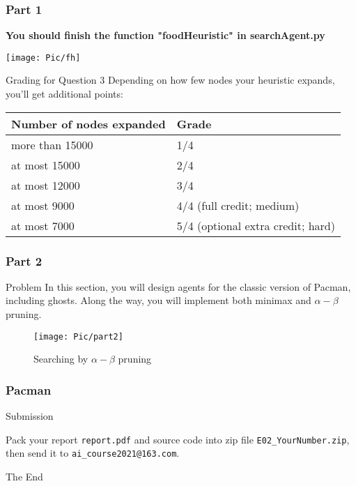 \documentclass{beamer}
\begin{document}
\begin{frame}
  \frametitle{Part 1}

      \textbf{You should finish the function "foodHeuristic" in searchAgent.py}

      \texttt{[image: Pic/fh]}

  \begin{block}{Grading for Question 3}
 Depending on how few nodes your heuristic expands, you'll get additional points:

\begin{center}
\begin{tabular}{||l||l||}
  \hline\hline
  Number of nodes expanded & Grade\\
  \hline\hline
  more than 15000 & 1/4\\
  \hline\hline
  at most 15000 & 2/4\\
  \hline\hline
  at most 12000 & 3/4\\
  \hline\hline
  at most 9000 & 4/4 (full credit; medium)\\
  \hline\hline
  at most 7000 & 5/4 (optional extra credit; hard)\\
  \hline\hline
\end{tabular}
\end{center}

\end{block}


\end{frame}

\begin{frame}
  \frametitle{Part 2}
  \begin{block}{Problem}
    In this section, you will design agents for the classic version of Pacman, including ghosts. Along the way, you will implement both minimax and $\alpha-\beta$ pruning.
    \begin{figure}[ht]
      \centering
      \texttt{[image: Pic/part2]}
      \caption{Searching by $\alpha-\beta$ pruning}
    \end{figure}
  \end{block}
\end{frame}


\begin{frame}
  \frametitle{Pacman}
  \begin{block}{Submission}

    Pack your report \texttt{report.pdf} and source code into zip file \texttt{E02\_YourNumber.zip}, then send it to \texttt{ai\_course2021@163.com}.
  \end{block}
\end{frame}





\begin{frame}
  \Huge{\centerline{The End}}
\end{frame}

\end{document}

